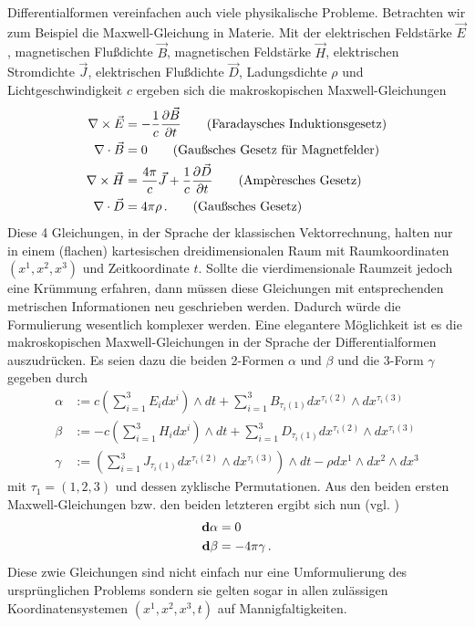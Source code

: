 Differentialformen vereinfachen auch viele physikalische Probleme. 
Betrachten wir zum Beispiel die Maxwell-Gleichung in Materie.
Mit der elektrischen Feldstärke \( \vec{E} \), magnetischen Flußdichte \( \vec{B} \), magnetischen Feldstärke \( \vec{H} \), elektrischen Stromdichte \( \vec{J} \),
elektrischen Flußdichte \( \vec{D} \), Ladungsdichte \( \rho \) und Lichtgeschwindigkeit \( c \)
ergeben sich die makroskopischen Maxwell-Gleichungen 
\begin{align}
  \nabla \times \vec{E} &= - \frac{1}{c} \frac{\partial \vec{B}}{\partial t} \tag{Faradaysches Induktionsgesetz} \\
  \nabla \cdot \vec{B} &= 0 \tag{Gaußsches Gesetz für Magnetfelder}\\
  \nabla \times \vec{H} &= \frac{4\pi}{c} \vec{J} + \frac{1}{c} \frac{\partial\vec{D}}{\partial t}  \tag{Amp\`{e}resches Gesetz}\\
  \nabla \cdot \vec{D} &= 4 \pi \rho \formpunkt \tag{Gaußsches Gesetz}
\end{align}
Diese 4 Gleichungen, in der Sprache der klassischen Vektorrechnung, halten nur in einem (flachen) kartesischen dreidimensionalen Raum mit Raumkoordinaten 
\( \left( x^{1}, x^{2}, x^{3} \right) \) und Zeitkoordinate \( t \).
Sollte die vierdimensionale Raumzeit jedoch eine Krümmung erfahren, dann müssen diese Gleichungen mit entsprechenden metrischen Informationen neu geschrieben werden.
Dadurch würde die Formulierung wesentlich komplexer werden. 
Eine elegantere Möglichkeit ist es die makroskopischen Maxwell-Gleichungen in der Sprache der Differentialformen auszudrücken. 
Es seien dazu die beiden 2-Formen \( \alpha \) und \( \beta \)
und die 3-Form \( \gamma \) gegeben durch
\begin{align}
    \alpha &:= c \left( \sum_{i=1}^{3} E_{i}dx^{i}\right) \wedge dt 
                + \sum_{i=1}^{3} B_{\tau_{i}(1)} dx^{\tau_{i}(2)}\wedge dx^{\tau_{i}(3)}\\
    \beta &:=  - c \left( \sum_{i=1}^{3} H_{i}dx^{i}\right) \wedge dt
                + \sum_{i=1}^{3} D_{\tau_{i}(1)} dx^{\tau_{i}(2)}\wedge dx^{\tau_{i}(3)} \\
    \gamma &:= \left( \sum_{i=1}^{3} J_{\tau_{i}(1)} dx^{\tau_{i}(2)}\wedge dx^{\tau_{i}(3)} \right) \wedge dt
                - \rho dx^{1} \wedge dx^{2} \wedge dx^{3}
\end{align}
mit \( \tau_{1}=\left( 1,2,3 \right) \) und dessen zyklische Permutationen.
Aus den beiden ersten Maxwell-Gleichungen bzw. den beiden letzteren ergibt sich nun (vgl. \cite[4.6]{flanders})
\begin{align}
  \begin{aligned}
    \mathbf{d}\alpha &= 0 \\
    \mathbf{d}\beta  &= -4\pi\gamma  \,\text{.}
  \end{aligned}
\end{align}
Diese zwie Gleichungen sind nicht einfach nur eine Umformulierung des ursprünglichen Problems 
sondern sie gelten sogar in allen zulässigen Koordinatensystemen \( \left( x^{1}, x^{2}, x^{3}, t  \right) \) auf Mannigfaltigkeiten.

